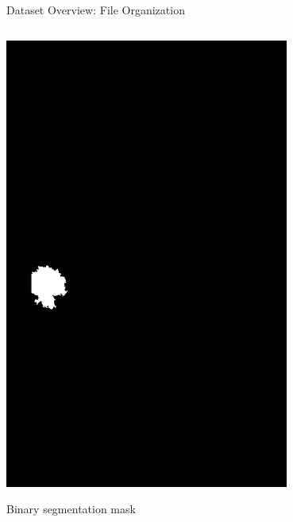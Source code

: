 \documentclass[8pt,aspectratio=169,xcolor=dvipsnames]{beamer}
\begin{document}
\begin{frame}{Dataset Overview: File Organization}
\begin{columns}
\begin{column}{0.3\textwidth}
            \includegraphics[width=0.7\textwidth]{ddsmroi.png}
            
            \small
            Binary segmentation mask
        \end{column}
    \end{columns}
    
    \vspace{0.3cm}
    
\end{frame}
\end{document}
